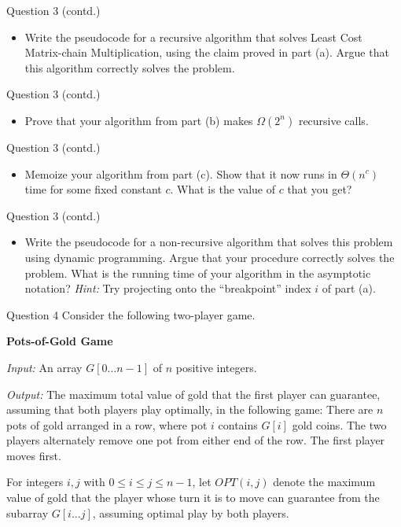 \documentclass{beamer}
\begin{document}
\begin{frame}{Question 3 (contd.)}
\begin{itemize}
  \item[(b)] Write the pseudocode for a recursive algorithm that solves Least Cost Matrix-chain Multiplication, using the claim proved in part (a). Argue that this algorithm correctly solves the problem.
\end{itemize}
\end{frame}

\begin{frame}{Question 3 (contd.)}
\begin{itemize}
  \item[(c)] Prove that your algorithm from part (b) makes $\Omega(2^n)$ recursive calls.
\end{itemize}
\end{frame}

\begin{frame}{Question 3 (contd.)}
\begin{itemize}
  \item[(d)] Memoize your algorithm from part (c). Show that it now runs in $\Theta(n^c)$ time for some fixed constant $c$. What is the value of $c$ that you get?
\end{itemize}
\end{frame}

\begin{frame}{Question 3 (contd.)}
\begin{itemize}
  \item[(e)] Write the pseudocode for a non-recursive algorithm that solves this problem using dynamic programming. Argue that your procedure correctly solves the problem. What is the running time of your algorithm in the asymptotic notation? \textit{Hint:} Try projecting onto the ``breakpoint'' index $i$ of part (a).
\end{itemize}
\end{frame}

\begin{frame}{Question 4}
Consider the following two-player game.

\medskip
\textbf{Pots-of-Gold Game}

\textit{Input:} An array $G[0\ldots n-1]$ of $n$ positive integers.

\textit{Output:} The maximum total value of gold that the first player can guarantee, assuming that both players play optimally, in the following game: There are $n$ pots of gold arranged in a row, where pot $i$ contains $G[i]$ gold coins. The two players alternately remove one pot from either end of the row. The first player moves first.

\medskip
For integers $i, j$ with $0 \leq i \leq j \leq n-1$, let $OPT(i,j)$ denote the maximum value of gold that the player whose turn it is to move can guarantee from the subarray $G[i\ldots j]$, assuming optimal play by both players.
\end{frame}
\end{document}
